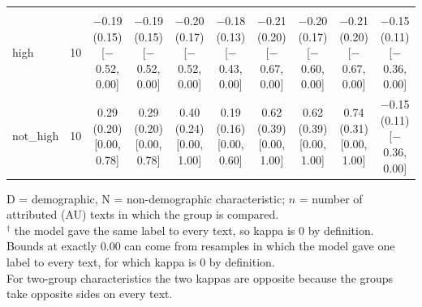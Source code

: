 \begin{table}[t]
\begin{tabular}{@{}lr*{8}{c}@{}}
\addlinespace
\multicolumn{10}{@{}l}{\textit{Religion (N)}} \\
\quad high & 10 & \makecell{$-$0.19 (0.15)\\ {[}$-$0.52, 0.00{]}} & \makecell{$-$0.19 (0.15)\\ {[}$-$0.52, 0.00{]}} & \makecell{$-$0.20 (0.17)\\ {[}$-$0.52, 0.00{]}} & \makecell{$-$0.18 (0.13)\\ {[}$-$0.43, 0.00{]}} & \makecell{$-$0.21 (0.20)\\ {[}$-$0.67, 0.00{]}} & \makecell{$-$0.20 (0.17)\\ {[}$-$0.60, 0.00{]}} & \makecell{$-$0.21 (0.20)\\ {[}$-$0.67, 0.00{]}} & \makecell{$-$0.15 (0.11)\\ {[}$-$0.36, 0.00{]}} \\
\quad not\_high & 10 & \makecell{0.29 (0.20)\\ {[}0.00, 0.78{]}} & \makecell{0.29 (0.20)\\ {[}0.00, 0.78{]}} & \makecell{0.40 (0.24)\\ {[}0.00, 1.00{]}} & \makecell{0.19 (0.16)\\ {[}0.00, 0.60{]}} & \makecell{0.62 (0.39)\\ {[}0.00, 1.00{]}} & \makecell{0.62 (0.39)\\ {[}0.00, 1.00{]}} & \makecell{0.74 (0.31)\\ {[}0.00, 1.00{]}} & \makecell{$-$0.15 (0.11)\\ {[}$-$0.36, 0.00{]}} \\
\bottomrule
\end{tabular}
\par\smallskip
\begin{minipage}{\linewidth}
\footnotesize
D = demographic, N = non-demographic characteristic; $n$ = number of attributed (\ac{AU}) texts in which the group is compared. \\
$^\dagger$ the model gave the same label to every text, so kappa is 0 by definition. \\
Bounds at exactly 0.00 can come from resamples in which the model gave one label to every text, for which kappa is 0 by definition. \\
For two-group characteristics the two kappas are opposite because the groups take opposite sides on every text.
\end{minipage}
\end{table}
